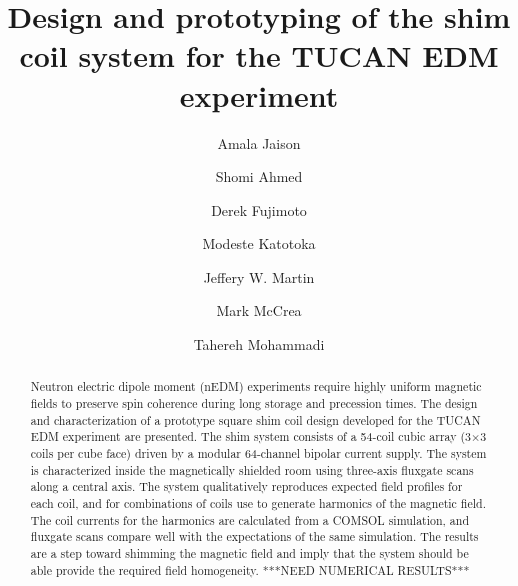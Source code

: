 \documentclass[preprint,12pt]{elsarticle}
\begin{document}
\begin{frontmatter}

\title{Design and prototyping of the shim coil system for the TUCAN EDM experiment}

\author[uwinnipeg,umanitoba]{Amala Jaison}

\author[uwinnipeg,carleton]{Shomi Ahmed}

\author[triumf]{Derek Fujimoto}

\author[uwinnipeg]{Modeste Katotoka}

\author[uwinnipeg]{Jeffery W. Martin}

\author[uwinnipeg]{Mark McCrea}

\author[umanitoba]{Tahereh Mohammadi}






\begin{abstract}
Neutron electric dipole moment (nEDM) experiments require highly
uniform magnetic fields to preserve spin coherence during long storage
and precession times. The design and characterization of a prototype
square shim coil design developed for the TUCAN EDM experiment are
presented. The shim system consists of a 54-coil cubic array
(3$\times$3 coils per cube face) driven by a modular 64-channel
bipolar current supply.  The system is characterized inside the
magnetically shielded room using three-axis fluxgate scans along a
central axis.  The system qualitatively reproduces expected field
profiles for each coil, and for combinations of coils use to generate
harmonics of the magnetic field.  The coil currents for the harmonics
are calculated from a COMSOL simulation, and fluxgate scans compare
well with the expectations of the same simulation.  The results are a
step toward shimming the magnetic field and imply that the system
should be able provide the required field homogeneity.  ***NEED
NUMERICAL RESULTS***
\end{abstract}


\end{frontmatter}
\end{document}
